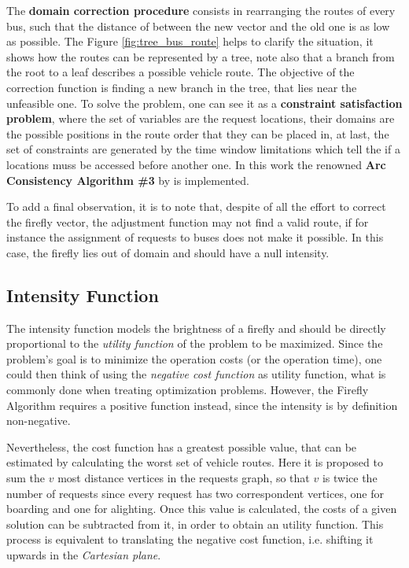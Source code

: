 \documentclass[tuberlin,cic,tc,openright,english,noabntcite,oneside]{iiufrgs}
\begin{document}
The \textbf{domain correction procedure} consists in rearranging the routes of every bus, such that the distance of between the new vector and the old one is as low as possible. The Figure \ref{fig:tree_bus_route} helps to clarify the situation, it shows how the routes can be represented by a tree, note also that a branch from the root to a leaf describes a possible vehicle route. The objective of the correction function is finding a new branch in the tree, that lies near the unfeasible one. To solve the problem, one can see it as a \textbf{constraint satisfaction problem}, where the set of variables are the request locations, their domains are the possible positions in the route order that they can be placed in, at last, the set of constraints are generated by the time window limitations which tell the if a locations muss be accessed before another one. In this work the renowned \textbf{Arc Consistency Algorithm \#3} by \textcite{mackworth_consistency_1977} is implemented.

To add a final observation, it is to note that, despite of all the effort to correct the firefly vector, the adjustment function may not find a valid route, if for instance the assignment of requests to buses does not make it possible. In this case, the firefly lies out of domain and should have a null intensity.

\subsection{Intensity Function}
The intensity function models the brightness of a firefly and should be directly proportional to the \emph{utility function} of the problem to be maximized. Since the problem's goal is to minimize the operation costs (or the operation time), one could then think of using the \emph{negative cost function} as utility function, what is commonly done when treating optimization problems. However, the Firefly Algorithm requires a positive function instead, since the intensity is by definition non-negative.

Nevertheless, the cost function has a greatest possible value, that can be estimated by calculating the worst set of vehicle routes. Here it is proposed to sum the $v$ most distance vertices in the requests graph, so that $v$ is twice the number of requests since every request has two correspondent vertices, one for boarding and one for alighting. Once this value is calculated, the costs of a given solution can be subtracted from it, in order to obtain an utility function. This process is equivalent to translating the negative cost function, i.e. shifting it upwards in the \emph{Cartesian plane}.
\end{document}

